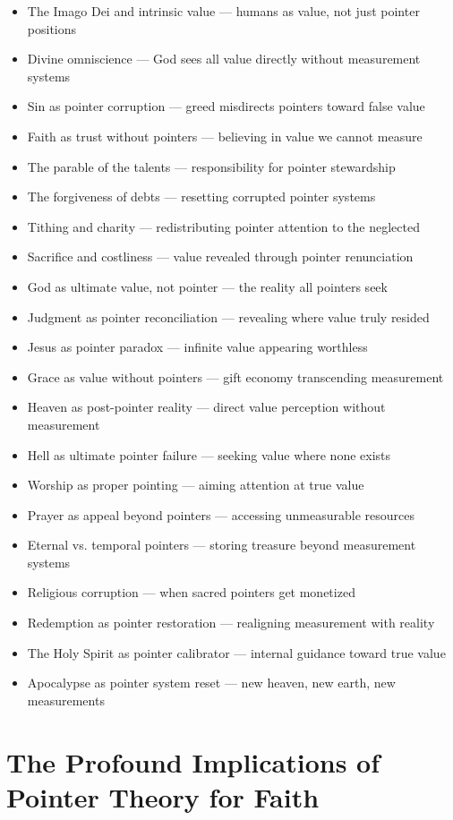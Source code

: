 \documentclass[11pt,oneside]{book}
\begin{document}
\begin{itemize}
\item The Imago Dei and intrinsic value — humans as value, not just pointer positions
\item Divine omniscience — God sees all value directly without measurement systems
\item Sin as pointer corruption — greed misdirects pointers toward false value
\item Faith as trust without pointers — believing in value we cannot measure
\item The parable of the talents — responsibility for pointer stewardship
\item The forgiveness of debts — resetting corrupted pointer systems
\item Tithing and charity — redistributing pointer attention to the neglected
\item Sacrifice and costliness — value revealed through pointer renunciation
\item God as ultimate value, not pointer — the reality all pointers seek
\item Judgment as pointer reconciliation — revealing where value truly resided
\item Jesus as pointer paradox — infinite value appearing worthless
\item Grace as value without pointers — gift economy transcending measurement
\item Heaven as post-pointer reality — direct value perception without measurement
\item Hell as ultimate pointer failure — seeking value where none exists
\item Worship as proper pointing — aiming attention at true value
\item Prayer as appeal beyond pointers — accessing unmeasurable resources
\item Eternal vs. temporal pointers — storing treasure beyond measurement systems
\item Religious corruption — when sacred pointers get monetized
\item Redemption as pointer restoration — realigning measurement with reality
\item The Holy Spirit as pointer calibrator — internal guidance toward true value
\item Apocalypse as pointer system reset — new heaven, new earth, new measurements
\end{itemize}

\section{The Profound Implications of Pointer Theory for Faith}
\end{document}
